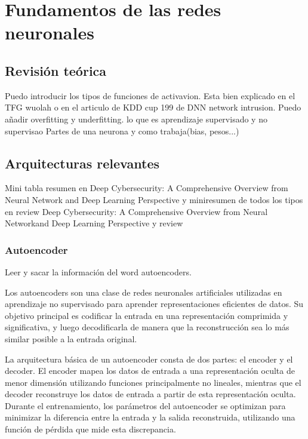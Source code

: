 \chapter{Fundamentos de las redes neuronales} \label{Capitulo_2}


 

\section{Revisión teórica} \label{Subsec: 3_1}
Puedo introducir los tipos de funciones de activavion. Esta bien explicado en el TFG wuolah o en el articulo de KDD cup 199 de DNN network intrusion.
Puedo añadir overfitting y underfitting.
lo que es aprendizaje supervisado y no supervisao
Partes de una neurona y como trabaja(bias, pesos...)


\section{Arquitecturas relevantes} \label{Subsec: 3_2}
Mini tabla resumen en Deep Cybersecurity: A Comprehensive Overview from Neural Network and Deep Learning Perspective y miniresumen de todos los tipos en review Deep Cybersecurity: A Comprehensive Overview from Neural Networkand Deep Learning Perspective y review
\subsection{Autoencoder}

Leer y sacar la información del word autoencoders.

Los autoencoders son una clase de redes neuronales artificiales utilizadas en aprendizaje no supervisado para aprender representaciones eficientes de datos. Su objetivo principal es codificar la entrada en una representación comprimida y significativa, y luego decodificarla de manera que la reconstrucción sea lo más similar posible a la entrada original.

La arquitectura básica de un autoencoder consta de dos partes: el encoder y el decoder. El encoder mapea los datos de entrada a una representación oculta de menor dimensión utilizando funciones principalmente no lineales, mientras que el decoder reconstruye los datos de entrada a partir de esta representación oculta. Durante el entrenamiento, los parámetros del autoencoder se optimizan para minimizar la diferencia entre la entrada y la salida reconstruida, utilizando una función de pérdida que mide esta discrepancia.

